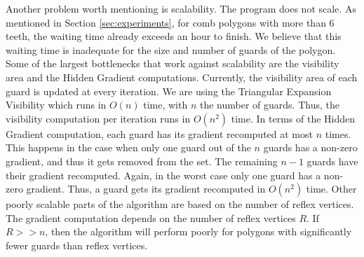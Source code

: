 Another problem worth mentioning is scalability. The program does not scale. As mentioned in Section \ref{sec:experiments}, for comb polygons with more than 6 teeth, the waiting time already exceeds an hour to finish. We believe that this waiting time is inadequate for the size and number of guards of the polygon.
Some of the largest bottlenecks that work against scalability are the visibility area and the Hidden Gradient computations. Currently, the visibility area of each guard is updated at every iteration. We are using the Triangular Expansion Visibility \cite{DBLP:journals/corr/BungiuHHHK14} which runs in $O(n)$ time, with $n$ the number of guards. Thus, the visibility computation per iteration runs in $O(n^2)$ time. 
In terms of the Hidden Gradient computation, each guard has its gradient recomputed at most $n$ times. This happens in the case when only one guard out of the $n$ guards has a non-zero gradient, and thus it gets removed from the set. The remaining $n - 1$ guards have their gradient recomputed. Again, in the worst case only one guard has a non-zero gradient. Thus, a guard gets its gradient recomputed in $O(n^2)$ time.
Other poorly scalable parts of the algorithm are based on the number of reflex vertices. The gradient computation depends on the number of reflex vertices $R$. If $R >> n$, then the algorithm will perform poorly for polygons with significantly fewer guards than reflex vertices.

